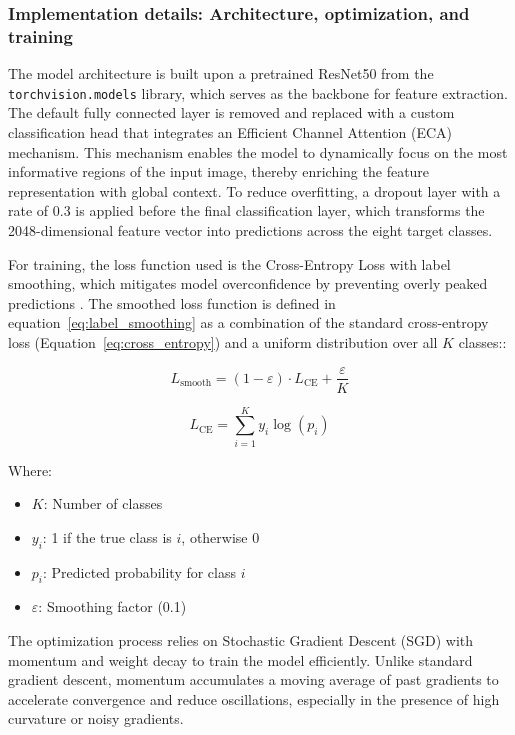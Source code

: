 \subsubsection{Implementation details: Architecture, optimization, and training}
The model architecture is built upon a pretrained ResNet50 from the \texttt{torchvision.models} library, which serves as the backbone for feature extraction. The default fully connected layer is removed and replaced with a custom classification head that integrates an Efficient Channel Attention (ECA) mechanism. This mechanism enables the model to dynamically focus on the most informative regions of the input image, thereby enriching the feature representation with global context. To reduce overfitting, a dropout layer with a rate of 0.3 is applied before the final classification layer, which transforms the 2048-dimensional feature vector into predictions across the eight target classes.

For training, the loss function used is the Cross-Entropy Loss with label smoothing, which mitigates model overconfidence by preventing overly peaked predictions \parencite{szegedy2016rethinking}. The smoothed loss function is defined in equation~\ref{eq:label_smoothing} as a combination of the standard cross-entropy loss (Equation~\ref{eq:cross_entropy}) and a uniform distribution over all $K$ classes::

\begin{equation}
L_{\text{smooth}} = (1 - \varepsilon) \cdot L_{\text{CE}} + \frac{\varepsilon}{K}
\label{eq:label_smoothing}
\end{equation}

\begin{equation}
L_{\text{CE}} = \sum_{i=1}^{K} y_i \log(p_i)
\label{eq:cross_entropy}
\end{equation}

Where:
\begin{itemize}
  \item $K$: Number of classes
  \item $y_i$: 1 if the true class is $i$, otherwise 0
  \item $p_i$: Predicted probability for class $i$
  \item $\varepsilon$: Smoothing factor (0.1)
\end{itemize}


The optimization process relies on Stochastic Gradient Descent (SGD) with momentum and weight decay to train the model efficiently. Unlike standard gradient descent, momentum accumulates a moving average of past gradients to accelerate convergence and reduce oscillations, especially in the presence of high curvature or noisy gradients.

